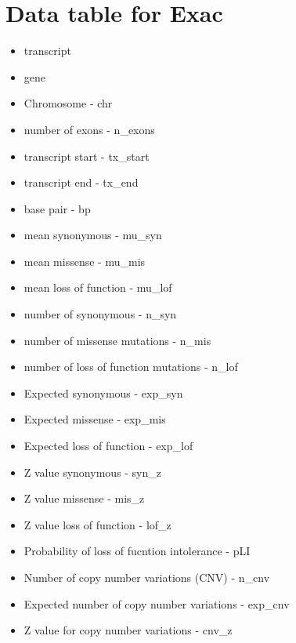 \section{Data table for Exac}
\label{sec:supplemental data table for exac}
\begin{itemize}
    \item { transcript}
    \item{gene}
    \item{Chromosome - chr}
    \item{number of exons - n\_exons}
    \item{transcript start - tx\_start}
    \item{transcript end - tx\_end}
    \item{base pair - bp}
    \item{mean synonymous - mu\_syn}
    \item{mean missense - mu\_mis}
    \item{mean loss of function - mu\_lof}
    \item{number of synonymous - n\_syn}
    \item{number of missense mutations - n\_mis}
    \item{number of loss of function mutations - n\_lof}
    \item{Expected synonymous - exp\_syn}
    \item{Expected missense - exp\_mis}
    \item{Expected loss of function - exp\_lof}
    \item{Z value synonymous - syn\_z}
    \item{Z value missense - mis\_z}
    \item{Z value loss of function - lof\_z}
    \item{Probability of loss of fucntion intolerance - pLI}
    \item{Number of copy number variations (CNV) - n\_cnv}
    \item{Expected number of copy number variations - exp\_cnv}
    \item{Z value for copy number variations - cnv\_z}
    
\end{itemize}
